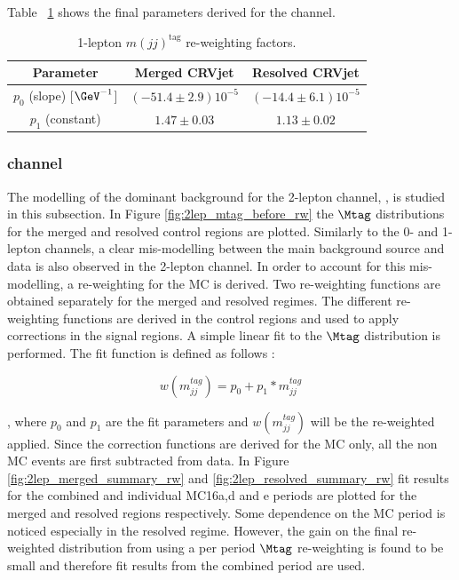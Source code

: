 Table ~\ref{tab:1lepReweighting} shows the final parameters derived for the \olep channel.

\begin{table}[ht]
     \centering
     \caption{1-lepton $m(jj)^\text{tag}$ re-weighting factors.}
     \label{tab:1lepReweighting}
         \begin{tabular}{ |c|c|c| }
\hline
Parameter & Merged CRVjet & Resolved CRVjet  \\ 
\hline
$p_{0}$ (slope) [$\GeV^{-1}$] & $(-51.4 \pm 2.9)10^{-5}$ &  $(-14.4 \pm 6.1)10^{-5}$ \\
 \hline
$p_{1}$ (constant)  & $1.47 \pm 0.03$ & $1.13 \pm 0.02$ \\ 
\hline
         \end{tabular}
\end{table}



\clearpage
\subsubsection{\tlep channel}
\label{subsec:mjj_reweight_2lep}

The modelling of the dominant background for the 2-lepton channel, \Zjets, 
is studied in this subsection. 
In Figure \ref{fig:2lep_mtag_before_rw} the $\Mtag$ distributions for the merged and resolved 
control regions are plotted.  Similarly to the 0- and 1-lepton channels, 
a clear mis-modelling between the main background source and data is also observed in the 2-lepton channel. 
In order to account for this mis-modelling, a re-weighting for the \Zjets MC is derived. 
Two re-weighting functions are obtained separately for the merged and resolved regimes. 
The different re-weighting functions are derived in the control regions and used to apply corrections in the signal regions. 
A simple linear fit to the $\Mtag$ distribution is performed. 
The fit function is defined as follows : 


\begin{equation}
  w(m_{jj}^{tag}) =  p_0 + p_1 * m_{jj}^{tag}
\end{equation}

, where $p_0$ and $p_1$ are the fit parameters and $w(m_{jj}^{tag})$ will be the re-weighted applied. Since the correction functions are derived for the \Zjets MC only, all the non \Zjets MC events are first subtracted from data. In Figure  \ref{fig:2lep_merged_summary_rw} and  \ref{fig:2lep_resolved_summary_rw} fit results for the combined and individual MC16a,d and e periods are plotted for the merged and resolved regions respectively. Some dependence on the MC period is noticed especially in the resolved regime. However, the gain on the final re-weighted distribution from using a per period $\Mtag$ re-weighting is found to be small and therefore fit results from the combined period are used. 


